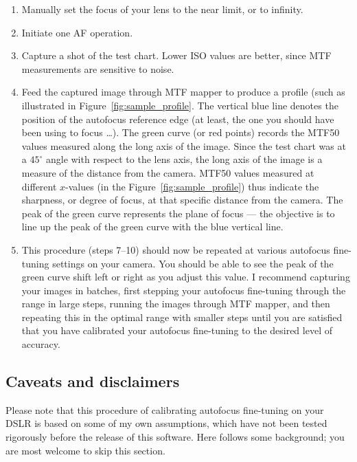 \documentclass[a4paper]{article}
\begin{document}
\begin{enumerate}
    \item Manually set the focus of your lens to the near limit, or to
infinity.

    \item Initiate one AF operation.
   
    \item Capture a shot of the test chart. Lower ISO values are better, since MTF
measurements are sensitive to noise.

    \item Feed the captured image through MTF mapper to produce a profile
(such as illustrated in Figure~\ref{fig:sample_profile}. The vertical blue
line denotes the position of the autofocus reference edge (at least, the one
you should have been using to focus \ldots). The green curve (or red
points) records the MTF50 values measured along the long axis of the image.
Since the test chart was at a $45^\circ$ angle with respect to the lens
axis, the long axis of the image is a measure of the distance from the
camera. MTF50 values measured at different $x$-values (in the
Figure~\ref{fig:sample_profile}) thus indicate the
sharpness, or degree of focus, at that specific distance from the camera.
The peak of the green curve represents the plane of focus --- the objective
is to line up the peak of the green curve with the blue vertical line.

    \item This procedure (steps 7--10) should now be repeated at various autofocus
fine-tuning settings on your camera. You should be able to see the peak of
the green curve shift left or right as you adjust this value. I recommend
capturing your images in batches, first stepping your autofocus fine-tuning
through the range in large steps, running the images through MTF mapper, and
then repeating this in the optimal range with smaller steps until you are
satisfied that you have calibrated your autofocus fine-tuning to the desired
level of accuracy.
\end{enumerate}

\subsection{Caveats and disclaimers}
Please note that this procedure of calibrating autofocus fine-tuning on your
DSLR is based on some of my own assumptions, which have not been tested
rigorously before the release of this software. Here follows some
background; you are most welcome to skip this section.
\end{document}
